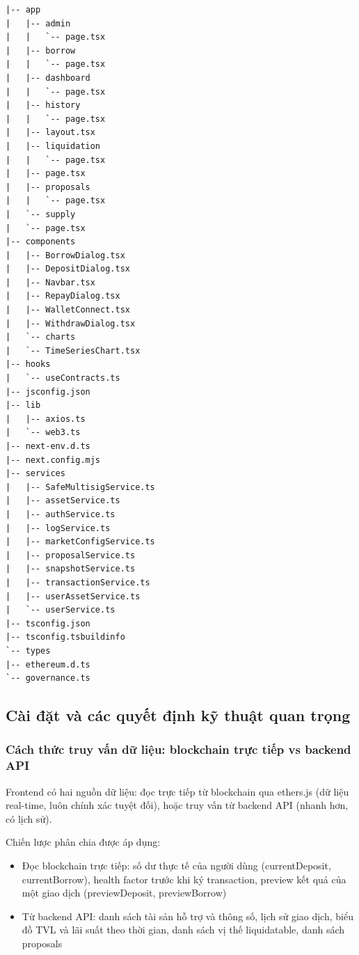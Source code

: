 \documentclass[../DoAn.tex]{subfiles}
\begin{document}
\begin{lstlisting}
|-- app
|   |-- admin
|   |   `-- page.tsx
|   |-- borrow
|   |   `-- page.tsx
|   |-- dashboard
|   |   `-- page.tsx
|   |-- history
|   |   `-- page.tsx
|   |-- layout.tsx
|   |-- liquidation
|   |   `-- page.tsx
|   |-- page.tsx
|   |-- proposals
|   |   `-- page.tsx
|   `-- supply
|   `-- page.tsx
|-- components
|   |-- BorrowDialog.tsx
|   |-- DepositDialog.tsx
|   |-- Navbar.tsx
|   |-- RepayDialog.tsx
|   |-- WalletConnect.tsx
|   |-- WithdrawDialog.tsx
|   `-- charts
|   `-- TimeSeriesChart.tsx
|-- hooks
|   `-- useContracts.ts
|-- jsconfig.json
|-- lib
|   |-- axios.ts
|   `-- web3.ts
|-- next-env.d.ts
|-- next.config.mjs
|-- services
|   |-- SafeMultisigService.ts
|   |-- assetService.ts
|   |-- authService.ts
|   |-- logService.ts
|   |-- marketConfigService.ts
|   |-- proposalService.ts
|   |-- snapshotService.ts
|   |-- transactionService.ts
|   |-- userAssetService.ts
|   `-- userService.ts
|-- tsconfig.json
|-- tsconfig.tsbuildinfo
`-- types
|-- ethereum.d.ts
`-- governance.ts
\end{lstlisting}

\subsection{Cài đặt và các quyết định kỹ thuật quan trọng}


\subsubsection{Cách thức truy vấn dữ liệu: blockchain trực tiếp vs backend API}


Frontend có hai nguồn dữ liệu: đọc trực tiếp từ blockchain qua ethers.js (dữ liệu real-time, luôn chính xác tuyệt đối), hoặc truy vấn từ backend API (nhanh hơn, có lịch sử).

Chiến lược phân chia được áp dụng:

\begin{itemize}
  \item Đọc blockchain trực tiếp: số dư thực tế của người dùng (currentDeposit, currentBorrow), health factor trước khi ký transaction, preview kết quả của một giao dịch (previewDeposit, previewBorrow)
  \item Từ backend API: danh sách tài sản hỗ trợ và thông số, lịch sử giao dịch, biểu đồ TVL và lãi suất theo thời gian, danh sách vị thế liquidatable, danh sách proposals
\end{itemize}
\end{document}
